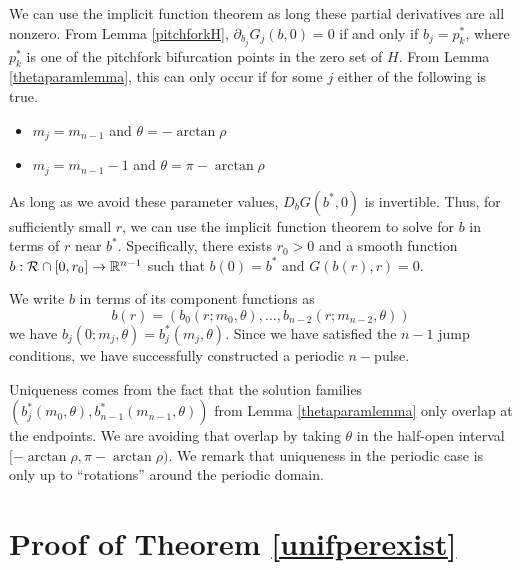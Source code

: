 \documentclass[thesis.tex]{subfiles}
\begin{document}
We can use the implicit function theorem as long these partial derivatives are all nonzero. From Lemma \ref{pitchforkH}, $\partial_{b_j} G_j(b, 0) = 0$ if and only if $b_j = p_k^*$, where $p_k^*$ is one of the pitchfork bifurcation points in the zero set of $H$. From Lemma \ref{thetaparamlemma}, this can only occur if for some $j$ either of the following is true.
\begin{itemize}
\item $m_j = m_{n-1}$ and $\theta = -\arctan \rho$
\item $m_j = m_{n-1} - 1$ and $\theta = \pi-\arctan \rho$
\end{itemize}
As long as we avoid these parameter values, $D_b G(b^*, 0)$ is invertible. Thus, for sufficiently small $r$, we can use the implicit function theorem to solve for $b$ in terms of $r$ near $b^*$. Specifically, there exists $r_0 > 0$ and a smooth function $b: \mathcal{R} \cap [0, r_0] \rightarrow \mathbb{R}^{n-1}$ such that $b(0) = b^*$ and $G(b(r),r) = 0$. 

We write $b$ in terms of its component functions as
\[
b(r) = \left( b_0(r; m_0, \theta), \dots, b_{n-2}(r; m_{n-2}, \theta) \right)
\]
we have $b_j(0; m_j, \theta) = b_j^*(m_j, \theta)$. Since we have satisfied the $n-1$ jump conditions, we have successfully constructed a periodic $n-$pulse.

Uniqueness comes from the fact that the solution families $(b_j^*(m_0, \theta), b_{n-1}^*(m_{n-1}, \theta))$ from Lemma \eqref{thetaparamlemma} only overlap at the endpoints. We are avoiding that overlap by taking $\theta$ in the half-open interval $[-\arctan \rho, \pi - \arctan \rho)$. We remark that uniqueness in the periodic case is only up to ``rotations'' around the periodic domain.

\section{Proof of Theorem \ref{unifperexist}}
\end{document}
